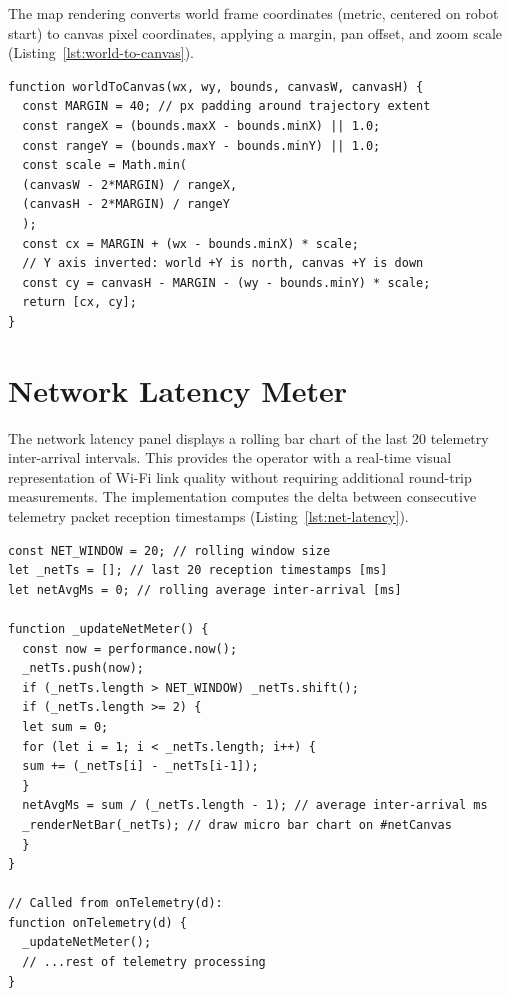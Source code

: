 The map rendering converts world frame coordinates (metric, centered on robot start) to canvas pixel coordinates, applying a margin, pan offset, and zoom scale (Listing~\ref{lst:world-to-canvas}).

\begin{lstlisting}[caption={World-frame to canvas-pixel coordinate transform}, label={lst:world-to-canvas}]
function worldToCanvas(wx, wy, bounds, canvasW, canvasH) {
  const MARGIN = 40; // px padding around trajectory extent
  const rangeX = (bounds.maxX - bounds.minX) || 1.0;
  const rangeY = (bounds.maxY - bounds.minY) || 1.0;
  const scale = Math.min(
  (canvasW - 2*MARGIN) / rangeX,
  (canvasH - 2*MARGIN) / rangeY
  );
  const cx = MARGIN + (wx - bounds.minX) * scale;
  // Y axis inverted: world +Y is north, canvas +Y is down
  const cy = canvasH - MARGIN - (wy - bounds.minY) * scale;
  return [cx, cy];
}
\end{lstlisting}

\section{Network Latency Meter}

The network latency panel displays a rolling bar chart of the last 20 telemetry inter-arrival intervals. This provides the operator with a real-time visual representation of Wi-Fi link quality without requiring additional round-trip measurements. The implementation computes the delta between consecutive telemetry packet reception timestamps (Listing~\ref{lst:net-latency}).

\begin{lstlisting}[caption={Rolling telemetry inter-arrival latency meter}, label={lst:net-latency}]
const NET_WINDOW = 20; // rolling window size
let _netTs = []; // last 20 reception timestamps [ms]
let netAvgMs = 0; // rolling average inter-arrival [ms]

function _updateNetMeter() {
  const now = performance.now();
  _netTs.push(now);
  if (_netTs.length > NET_WINDOW) _netTs.shift();
  if (_netTs.length >= 2) {
  let sum = 0;
  for (let i = 1; i < _netTs.length; i++) {
  sum += (_netTs[i] - _netTs[i-1]);
  }
  netAvgMs = sum / (_netTs.length - 1); // average inter-arrival ms
  _renderNetBar(_netTs); // draw micro bar chart on #netCanvas
  }
}

// Called from onTelemetry(d):
function onTelemetry(d) {
  _updateNetMeter();
  // ...rest of telemetry processing
}
\end{lstlisting}

